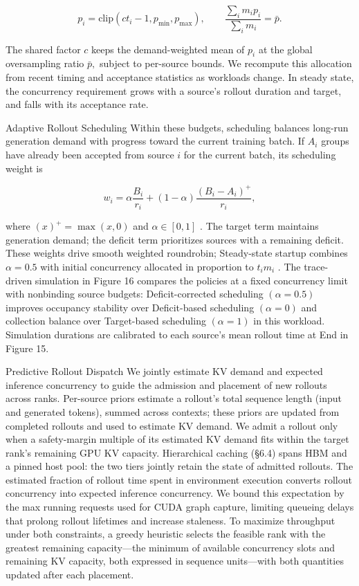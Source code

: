\documentclass[
  10
]{article}
\begin{document}
\[
p _ { i } = \mathrm { c l i p } ( c t _ { i } - 1 , p _ { \mathrm { m i n } } , p _ { \mathrm { m a x } } ) , \qquad \frac { \sum _ { i } m _ { i } p _ { i } } { \sum _ { i } m _ { i } } = \bar { p } .\tag{6}
\]

The shared factor $c$ keeps the demand-weighted mean of \(p _ { i }\) at
the global oversampling ratio \({ \bar { p } } ,\) subject to per-source
bounds. We recompute this allocation from recent timing and acceptance
statistics as workloads change. In steady state, the concurrency
requirement grows with a source's rollout duration and target, and falls
with its acceptance rate.

Adaptive Rollout Scheduling Within these budgets, scheduling balances
long-run generation demand with progress toward the current training
batch. If \(A _ { i }\) groups have already been accepted from source $i$
for the current batch, its scheduling weight is

\[
w _ { i } = \alpha \frac { B _ { i } } { r _ { i } } + ( 1 - \alpha ) \frac { ( B _ { i } - A _ { i } ) ^ { + } } { r _ { i } } ,\tag{7}
\]

where \(( x ) ^ { + } = \operatorname* { m a x } ( x , 0 )\) and
\(\alpha \in [ 0 , 1 ]\) . The target term maintains generation demand;
the deficit term prioritizes sources with a remaining deficit. These
weights drive smooth weighted roundrobin; Steady-state startup combines
\(\alpha = 0 . 5\) with initial concurrency allocated in proportion to
\(t _ { i } m _ { i }\) . The trace-driven simulation in Figure 16
compares the policies at a fixed concurrency limit with nonbinding
source budgets: Deficit-corrected scheduling \(( \alpha = 0 . 5 )\)
improves occupancy stability over Deficit-based scheduling
\(\left( \alpha = 0 \right)\) and collection balance over Target-based
scheduling \(( \alpha = 1 )\) in this workload. Simulation durations are
calibrated to each source's mean rollout time at End in Figure 15.

Predictive Rollout Dispatch We jointly estimate KV demand and expected
inference concurrency to guide the admission and placement of new
rollouts across ranks. Per-source priors estimate a rollout's total
sequence length (input and generated tokens), summed across contexts;
these priors are updated from completed rollouts and used to estimate KV
demand. We admit a rollout only when a safety-margin multiple of its
estimated KV demand fits within the target rank's remaining GPU KV
capacity. Hierarchical caching (§6.4) spans HBM and a pinned host pool:
the two tiers jointly retain the state of admitted rollouts. The
estimated fraction of rollout time spent in environment execution
converts rollout concurrency into expected inference concurrency. We
bound this expectation by the max running requests used for CUDA graph
capture, limiting queueing delays that prolong rollout lifetimes and
increase staleness. To maximize throughput under both constraints, a
greedy heuristic selects the feasible rank with the greatest remaining
capacity---the minimum of available concurrency slots and remaining KV
capacity, both expressed in sequence units---with both quantities
updated after each placement.
\end{document}
